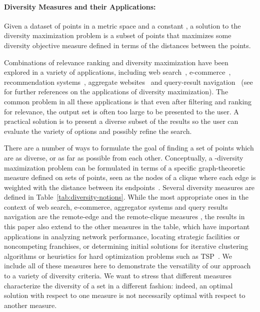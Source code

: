 \documentclass{article}
\begin{document}
\paragraph{Diversity Measures and their Applications:}
Given a dataset of
points in a metric space and a constant , a solution to the
diversity maximization problem is a subset of  points that
maximizes some diversity objective measure defined in terms of the
distances between the points.

Combinations of relevance ranking and diversity maximization have been
explored in a variety of applications, including web
search~\cite{AngelK11}, e-commerce~\cite{BhattacharyaGM11},
recommendation systems~\cite{YuLA09}, aggregate
websites~\cite{MunsonZR09} and query-result navigation~\cite{ChenL07} (see
\cite{RosenkrantzRT07,AbbassiMT13,IndykMMM14} for further references on the
applications of diversity maximization).  The common problem in all
these applications is that even after filtering and ranking for
relevance, the output set is often too large to be presented to the
user. A practical solution is to present a diverse subset of the
results so the user can evaluate the variety of options and possibly
refine the search.

There are a number of ways to formulate the goal of finding a set of
 points which are as diverse, or as far as possible from each
other. Conceptually, a -diversity maximization problem can be
formulated in terms of a specific graph-theoretic measure defined on
sets of  points, seen as the nodes of a clique where each edge is
weighted with the distance between its endpoints~\cite{ChandraH01}.
Several diversity measures are defined in
Table~\ref{tab:diversity-notions}.  While the most appropriate ones in
the context of web search, e-commerce, aggregator systems and query results
navigation are the remote-edge and the remote-clique measures
\cite{GollapudiS09,AbbassiMT13}, the results in this paper also extend
to the other measures in the table, which have important applications
in analyzing network performance, locating strategic facilities or
noncompeting franchises, or determining initial solutions for
iterative clustering algorithms or heuristics for hard optimization
problems such as
TSP~\cite{HalldorssonIKT99,ChandraH01,RosenkrantzRT07}. We include all
of these measures here to demonstrate the versatility of our approach
to a variety of diversity criteria. We want to stress that different
measures characterize the diversity of a set in a different fashion:
indeed, an optimal solution with respect to one measure is not
necessarily optimal with respect to another measure.
\end{document}

